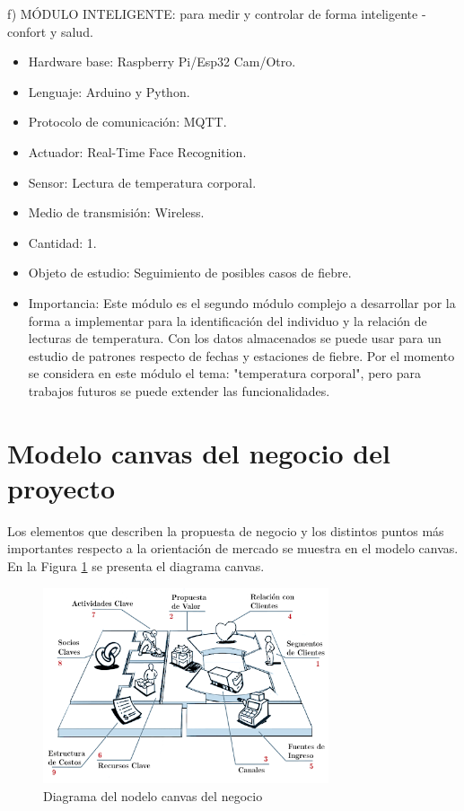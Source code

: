 \documentclass[11pt]{charter}
\begin{document}
f) MÓDULO INTELIGENTE: para medir y controlar de forma inteligente - confort y salud.
\begin{itemize}
\item Hardware base: Raspberry Pi/Esp32 Cam/Otro.
\item Lenguaje: Arduino y Python.
\item Protocolo de comunicación: MQTT.
\item Actuador: Real-Time Face Recognition.
\item Sensor: Lectura de temperatura corporal.
\item Medio de transmisión: Wireless.
\item Cantidad: 1.
\item Objeto de estudio: Seguimiento de posibles casos de fiebre.
\item Importancia: Este módulo es el segundo módulo complejo a desarrollar por la forma a implementar para la identificación del individuo y la relación de lecturas de temperatura. Con los datos almacenados se puede usar para un estudio de patrones respecto de fechas y estaciones de fiebre. Por el momento se considera en este módulo el tema: "temperatura corporal", pero para trabajos futuros se puede extender las funcionalidades.
\end{itemize}

\section{Modelo canvas del negocio del proyecto}

Los elementos que describen la propuesta de negocio y los distintos puntos más importantes respecto a la orientación de mercado se muestra en el modelo canvas. En la Figura \ref{fig:diagCanvas} se presenta el diagrama canvas. 

\vspace{25px}

\begin{figure}[htpb]
\centering 
\includegraphics[width=0.75\textwidth]{./Figuras/diagCanvas.png}
\caption{Diagrama del nodelo canvas del negocio}
\label{fig:diagCanvas}
\end{figure}
\end{document}
